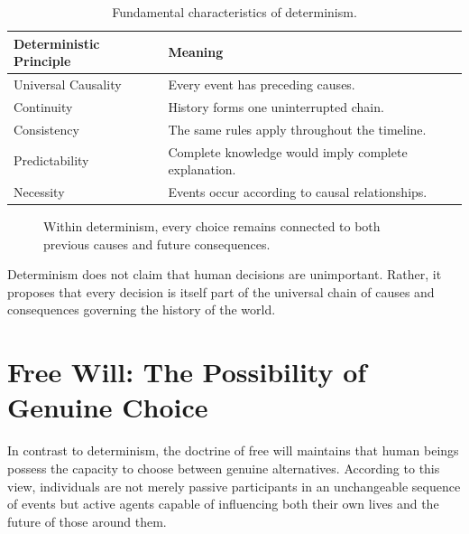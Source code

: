 \documentclass[12pt,oneside,openany]{book}
\begin{document}
\begin{table}[H]
\centering
\begin{tabular}{|p{4.2cm}|p{7.8cm}|}
\hline
\textbf{Deterministic Principle} & \textbf{Meaning}\\
\hline
Universal Causality & Every event has preceding causes.\\
\hline
Continuity & History forms one uninterrupted chain.\\
\hline
Consistency & The same rules apply throughout the timeline.\\
\hline
Predictability & Complete knowledge would imply complete explanation.\\
\hline
Necessity & Events occur according to causal relationships.\\
\hline
\end{tabular}
\caption{Fundamental characteristics of determinism.}
\end{table}

\begin{figure}[H]
\centering
{}
\caption{Within determinism, every choice remains connected to both previous causes and future consequences.}
\end{figure}

\begin{tcolorbox}[colback=blue!6,colframe=blue!60!black,title=Analysis]
Determinism does not claim that human decisions are unimportant. Rather, it
proposes that every decision is itself part of the universal chain of causes
and consequences governing the history of the world.
\end{tcolorbox}
\section{Free Will: The Possibility of Genuine Choice}

In contrast to determinism, the doctrine of free will maintains that human
beings possess the capacity to choose between genuine alternatives. According
to this view, individuals are not merely passive participants in an
unchangeable sequence of events but active agents capable of influencing both
their own lives and the future of those around them.
\end{document}
